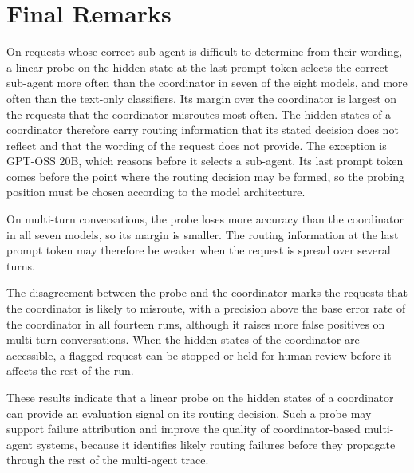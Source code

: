 \section{Final Remarks}
\label{sec:ch9-conclusion}

On requests whose correct sub-agent is difficult to determine from their wording, a linear probe on the hidden state at the last prompt token selects the correct sub-agent more often than the coordinator in seven of the eight models, and more often than the text-only classifiers. Its margin over the coordinator is largest on the requests that the coordinator misroutes most often. The hidden states of a coordinator therefore carry routing information that its stated decision does not reflect and that the wording of the request does not provide. The exception is GPT-OSS 20B, which reasons before it selects a sub-agent. Its last prompt token comes before the point where the routing decision may be formed, so the probing position must be chosen according to the model architecture.

On multi-turn conversations, the probe loses more accuracy than the coordinator in all seven models, so its margin is smaller. The routing information at the last prompt token may therefore be weaker when the request is spread over several turns.

The disagreement between the probe and the coordinator marks the requests that the coordinator is likely to misroute, with a precision above the base error rate of the coordinator in all fourteen runs, although it raises more false positives on multi-turn conversations. When the hidden states of the coordinator are accessible, a flagged request can be stopped or held for human review before it affects the rest of the run.

These results indicate that a linear probe on the hidden states of a coordinator can provide an evaluation signal on its routing decision. Such a probe may support failure attribution and improve the quality of coordinator-based multi-agent systems, because it identifies likely routing failures before they propagate through the rest of the multi-agent trace.
